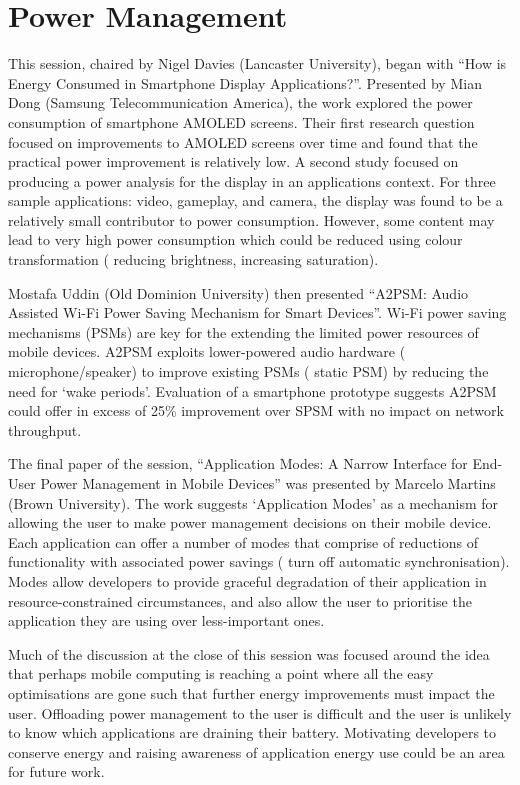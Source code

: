 \section{Power Management}
\label{sec:power}
This session, chaired by Nigel Davies (Lancaster University),
began with ``How is Energy Consumed in Smartphone Display Applications?''. 
Presented by Mian Dong (Samsung Telecommunication America), the work explored
the power consumption of smartphone AMOLED screens. Their first 
research question focused on improvements to AMOLED screens over time
and found that the practical power improvement is relatively low.
A second study focused on 
producing a power analysis for the display in an applications context. For three 
sample applications: video, gameplay, and camera, the display was found to be a 
relatively small contributor to power consumption. However, some content may lead 
to very high power consumption which could be reduced using colour 
transformation (\eg{} reducing brightness, increasing saturation).

Mostafa Uddin (Old Dominion University) then presented ``A2PSM: Audio Assisted 
Wi-Fi Power Saving Mechanism for Smart Devices''. Wi-Fi power saving mechanisms 
(PSMs) are key for the extending the limited power resources of mobile devices. 
A2PSM exploits lower-powered audio hardware (\eg{} microphone\slash speaker) to 
improve existing PSMs (\eg{} static PSM) by reducing the need for `wake periods'. 
Evaluation of a smartphone prototype suggests A2PSM could offer in excess of 25\%
improvement over SPSM with no impact on network throughput.

The final paper of the session, ``Application Modes: A Narrow Interface for End-
User Power Management in Mobile Devices'' was presented by Marcelo Martins (Brown 
University). The work suggests `Application Modes' as a mechanism for allowing 
the user to make power management decisions on their mobile device. Each 
application can offer a number of modes that comprise of reductions of 
functionality with associated power savings (\eg{} turn off automatic 
synchronisation). Modes allow developers to provide graceful degradation of their 
application in resource-constrained circumstances, and also allow the user to 
prioritise the application they are using over less-important ones.

Much of the discussion at the close of this session was focused around the idea
that perhaps mobile computing is reaching a point where all the easy 
optimisations are gone such that further energy improvements must impact the 
user. Offloading power management to the user is difficult and the user is 
unlikely to know which applications are draining their battery. Motivating 
developers to conserve energy and raising awareness of application energy use 
could be an area for future work. %
